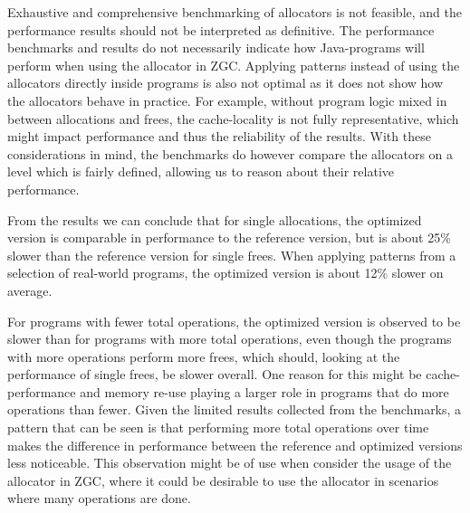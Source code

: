 


Exhaustive and comprehensive benchmarking of allocators is not feasible, and the performance results should not be interpreted as definitive. The performance benchmarks and results do not necessarily indicate how Java-programs will perform when using the allocator in ZGC. Applying patterns instead of using the allocators directly inside programs is also not optimal as it does not show how the allocators behave in practice. For example, without program logic mixed in between allocations and frees, the cache-locality is not fully representative, which might impact performance and thus the reliability of the results. With these considerations in mind, the benchmarks do however compare the allocators on a level which is fairly defined, allowing us to reason about their relative performance. 

From the results we can conclude that for single allocations, the optimized version is comparable in performance to the reference version, but is about 25\% slower than the reference version for single frees. When applying patterns from a selection of real-world programs, the optimized version is about 12\% slower on average. 

For programs with fewer total operations, the optimized version is observed to be slower than for programs with more total operations, even though the programs with more operations perform more frees, which should, looking at the performance of single frees, be slower overall. One reason for this might be cache-performance and memory re-use playing a larger role in programs that do more operations than fewer. Given the limited results collected from the benchmarks, a pattern that can be seen is that performing more total operations over time makes the difference in performance between the reference and optimized versions less noticeable. This observation might be of use when consider the usage of the allocator in ZGC, where it could be desirable to use the allocator in scenarios where many operations are done.

